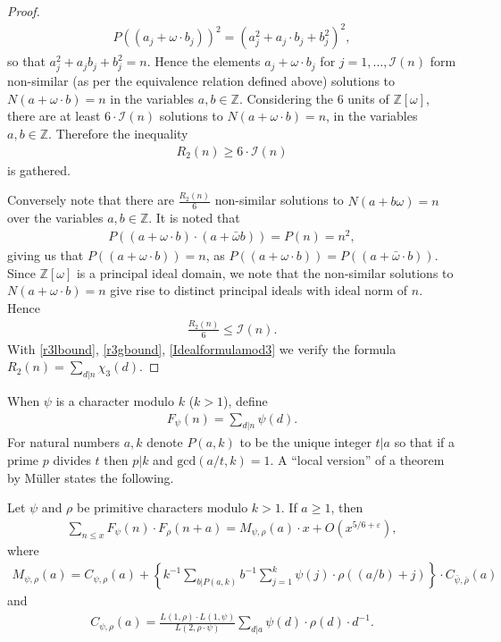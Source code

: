\documentclass[12pt]{amsart}
\newcommand{\1}{\mathmybb{1}}
\begin{document}
\begin{proof}
\begin{align*}
P((a_{j}+\omega\cdot b_{j}))^2 = (a_{j}^2+a_{j}\cdot b_{j}+b_{j}^2)^2,
\end{align*}
so that $a_{j}^2 +a_{j}b_{j}+b_{j}^2 = n$. Hence the elements $a_{j}+\omega\cdot b_{j}$ for $j = 1,\ldots,\mathcal{I}(n)$ form non-similar (as per the equivalence relation defined above) solutions to $N(a+\omega\cdot b) = n$ in the variables $a,b \in \mathbb{Z}$. Considering the $6$ units of $\mathbb{Z}[\omega]$, there are at least $6\cdot \mathcal{I}(n)$ solutions to $N(a+\omega\cdot b) = n$, in the variables $a,b \in \mathbb{Z}$. Therefore the inequality 
\begin{align}
\label{r3gbound}
R_{2}(n) \geq 6\cdot \mathcal{I}(n)
\end{align}
is gathered.

Conversely note that there are $\frac{R_{2}(n)}{6}$ non-similar solutions to $N(a+b\omega) = n$ over the variables $a,b \in \mathbb{Z}$. It is noted that
\begin{align*}
P((a+\omega\cdot b)\cdot(a+\bar{\omega}b)) =P(n) = n^2,
\end{align*}
giving us that $P((a+\omega\cdot b)) = n$, as $P((a+\omega\cdot b)) = P((a+\bar{\omega}\cdot b))$. Since $\mathbb{Z}[\omega]$ is a principal ideal domain, we note that the non-similar solutions to $N(a+\omega\cdot b) = n$ give rise to distinct principal ideals with ideal norm of $n$. Hence
\begin{align}
\label{r3lbound}
\frac{R_{2}(n)}{6} \leq \mathcal{I}(n).
\end{align}
With \eqref{r3lbound}, \eqref{r3gbound}, \eqref{Idealformulamod3} we verify the formula $R_{2}(n) = \sum_{d|n}\chi_{3}(d)$.
\end{proof}
When $\psi$ is a character modulo $k$ ($k>1$), define 
\begin{align*}
F_{\psi}(n) = \sum_{d|n}\psi(d).
\end{align*}
For natural numbers $a,k$ denote $P(a,k)$ to be the unique integer $t|a$ so that if a prime $p$ divides $t$ then $p|k$ and $\text{gcd}(a/t,k) = 1$. A ``local version'' of a theorem by M{\"u}ller \cite[Theorem 1]{Muller} states the following.
\begin{thm}
\label{Mullerthm}
Let $\psi$ and $\rho$ be primitive characters modulo $k > 1$. If $a \geq 1$, then
\begin{align*}
\sum_{n \leq x}F_{\psi}(n)\cdot F_{\rho}(n+a) = M_{\psi, \rho}(a)\cdot x+O(x^{5/6 + \varepsilon}),
\end{align*}
where 
\begin{align*}
M_{\psi, \rho}(a) = C_{\psi,\rho}(a)+\left\{k^{-1}\sum_{b| P(a,k)}b^{-1}\sum_{j=1}^{k}\psi(j)\cdot\rho((a/b) + j) \right\}\cdot C_{\bar{\psi},\bar{\rho}}(a)
\end{align*}
and
\begin{align*}
C_{\psi,\rho}(a) = \frac{L(1,\rho)\cdot L(1,\psi)}{L(2,\rho\cdot \psi)}\sum_{d|a}\psi(d)\cdot \rho(d)\cdot d^{-1}.
\end{align*}
\end{thm}
\end{document}
